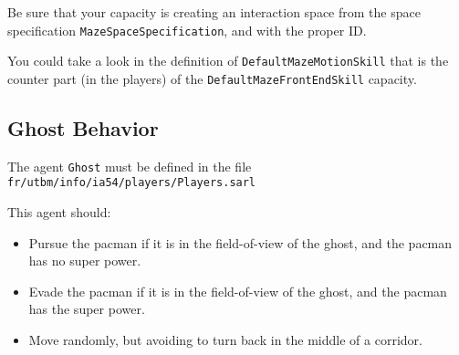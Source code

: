\documentclass[article,english,nodocumentinfo]{multiagentfrreport}
\begin{document}
Be sure that your capacity is creating an interaction space from the space specification \texttt{MazeSpaceSpecification}, and with the proper ID.

You could take a look in the definition of \texttt{DefaultMazeMotionSkill} that is the counter part (in the players) of the \texttt{DefaultMazeFrontEndSkill} capacity.

\subsection{Ghost Behavior}

The agent \texttt{Ghost} must be defined in the file \texttt{fr/utbm/info/ia54/players/Players.sarl}

This agent should:
\begin{itemize}
\item Pursue the pacman if it is in the field-of-view of the ghost, and the pacman has no super power.
\item Evade the pacman if it is in the field-of-view of the ghost, and the pacman has the super power.
\item Move randomly, but avoiding to turn back in the middle of a corridor.
\end{itemize}
\end{document}
